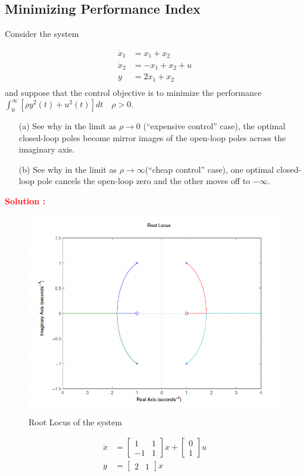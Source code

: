 \documentclass[12pt]{article}
\newcommand{\bmat}[1]{\begin{bmatrix} #1 \end{bmatrix}}
\begin{document}
\subsection{Minimizing Performance Index}

Consider the system

\begin{equation}
\begin{split}
    \dot{x}_1 &= x_1 + x_2 \\
    \dot{x}_2 &= - x_1 + x_2 + u \\
    y &= 2x_1 + x_2  \\
\end{split}
\end{equation}
and suppose that the control objective is to minimize the performance $ \int_0^\infty [\rho y^2(t) + u^2(t)]dt \quad  \rho> 0$.
\begin{itemize}
    \item [(a)] See why in the limit as $\rho \rightarrow 0$ (“expensive control” case), the optimal closed-loop poles become mirror images of the open-loop poles across the imaginary axis.
    \item [(b)] See why in the limit as  $\rho \rightarrow \infty$(“cheap control” case), one optimal closed-loop pole cancels the open-loop zero and the other moves off to $-\infty$.
\end{itemize}


\textbf{\textcolor{red}{Solution :}} \\

\begin{figure}[h!]
    \centering
    \includegraphics[width=0.5\linewidth]{figs/7.3.png}
    \caption{Root Locus of the system}
    \label{fig:prb18}
\end{figure}

\begin{equation*}
    \begin{split}
        \dot{x} &=\bmat{1 & 1\\ -1 &1} x +\bmat{0\\1}u \\
        y&=\bmat{2 & 1}x
    \end{split}
\end{equation*}
\end{document}

